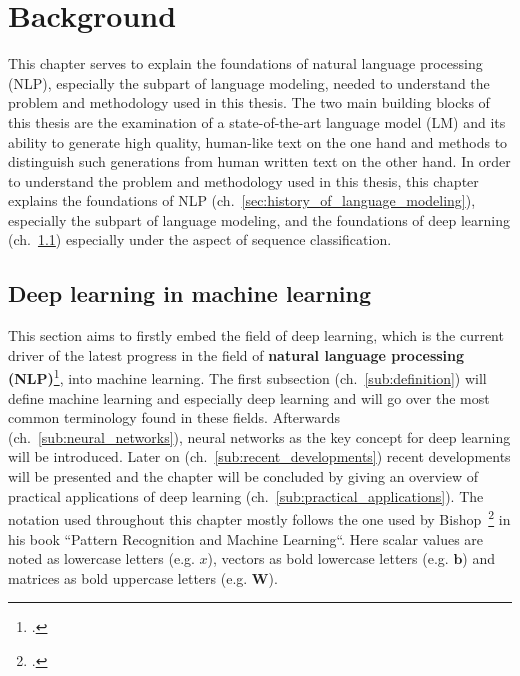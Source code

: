 \section{Background}
\label{ch:background}

This chapter serves to explain the foundations of natural language processing (NLP), especially the subpart of
language modeling, needed to understand the problem and methodology used in this thesis. The two main building blocks
of this thesis are the examination of a state-of-the-art language model (LM) and its ability to generate high quality,
human-like text on the one hand and methods to distinguish such generations from human written text on the other hand.
In order to understand the problem and methodology used in this thesis, this chapter explains the foundations
of NLP (ch.~\ref{sec:history_of_language_modeling}), especially the subpart of language
modeling, and the foundations of deep learning (ch.~\ref{sec:deep_learning_in_machine_learning}) especially under the aspect of sequence
classification.

\subsection{Deep learning in machine learning}
\label{sec:deep_learning_in_machine_learning}

This section aims to firstly embed the field of deep learning, which is the current driver of the latest progress in the field of \textbf{natural language processing (NLP)}\footcite{Deng2018}, into machine learning. The first subsection (ch.~\ref{sub:definition}) will define machine learning and especially deep learning and will go over the most common terminology found in these fields. Afterwards (ch.~\ref{sub:neural_networks}), neural networks as the key concept for deep learning will be introduced. Later on (ch.~\ref{sub:recent_developments}) recent developments will be presented and the chapter will be concluded by giving an overview of practical applications of deep learning (ch.~\ref{sub:practical_applications}). The notation used throughout this chapter mostly follows the one used by Bishop~\footcite{bishop2006pattern} in his book “Pattern Recognition and Machine Learning“. Here scalar values are noted as lowercase letters (e.g. $ x $), vectors as bold lowercase letters (e.g. $ \pmb{b} $) and matrices as bold uppercase letters (e.g. $ \pmb{W} $).





